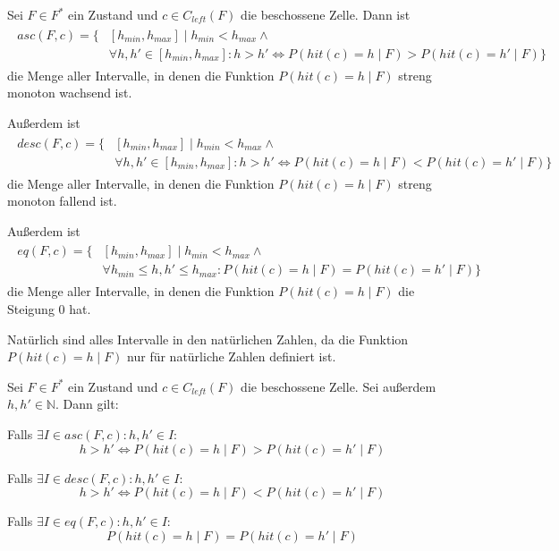 \documentclass[a4paper,12pt]{llncs}
\newcommand{\N}{{\mathbb{N}}}
\numberwithin{equation}{section}
\begin{document}
\begin{definition}
Sei $F\in F^*$ ein Zustand und $c \in C_{left}(F)$ die beschossene Zelle.
Dann ist
\begin{align}
\begin{split}
asc(F, c)=\{&[h_{min}, h_{max}] \mid h_{min} < h_{max} \wedge \\ 
&\forall h,h' \in [h_{min}, h_{max}]  \colon h > h' \Leftrightarrow P(hit(c)=h \mid F) > P(hit(c)=h' \mid F)\}
\nonumber
\end{split}
\end{align}
die Menge aller Intervalle, in denen die Funktion $P(hit(c)=h \mid F)$ streng monoton wachsend ist.

Außerdem ist
\begin{align}
\begin{split}
desc(F, c)=\{&[h_{min}, h_{max}] \mid h_{min} < h_{max} \wedge \\ 
&\forall h,h' \in [h_{min}, h_{max}]  \colon h > h' \Leftrightarrow P(hit(c)=h \mid F) < P(hit(c)=h' \mid F)\}
\nonumber
\end{split}
\end{align}
die Menge aller Intervalle, in denen die Funktion $P(hit(c)=h \mid F)$ streng monoton fallend ist.

Außerdem ist
\begin{align}
\begin{split}
eq(F, c)=\{&[h_{min}, h_{max}] \mid h_{min} < h_{max} \wedge \\ 
&\forall h_{min} \leq h,h' \leq h_{max} \colon P(hit(c)=h \mid F) = P(hit(c)=h' \mid F)\}
\nonumber
\end{split}
\end{align}
die Menge aller Intervalle, in denen die Funktion $P(hit(c)=h \mid F)$ die Steigung 0 hat.

Natürlich sind alles Intervalle in den natürlichen Zahlen, da die Funktion $P(hit(c)=h \mid F)$ nur für natürliche Zahlen definiert ist.
\end{definition}

\begin{lemma}
Sei $F\in F^*$ ein Zustand und $c \in C_{left}(F)$ die beschossene Zelle.
Sei außerdem $h,h' \in \N$.
Dann gilt:

Falls $\exists I \in asc(F, c) \colon h,h' \in I$:
\[
h > h' \Leftrightarrow P(hit(c)=h \mid F) > P(hit(c)=h' \mid F)
\]

Falls $\exists I \in desc(F, c) \colon h,h' \in I$:
\[
h > h' \Leftrightarrow P(hit(c)=h \mid F) < P(hit(c)=h' \mid F)
\]

Falls $\exists I \in eq(F, c) \colon h,h' \in I$:
\[
P(hit(c)=h \mid F) = P(hit(c)=h' \mid F)
\]

\end{lemma}
\end{document}
